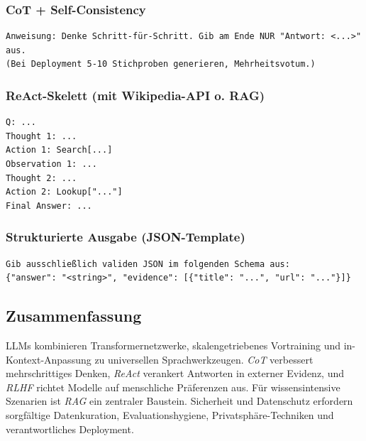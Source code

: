 \subsubsection*{CoT + Self-Consistency}
\begin{verbatim}
Anweisung: Denke Schritt-für-Schritt. Gib am Ende NUR "Antwort: <...>" aus.
(Bei Deployment 5-10 Stichproben generieren, Mehrheitsvotum.)
\end{verbatim}

\subsubsection*{ReAct-Skelett (mit Wikipedia-API o. RAG)}
\begin{verbatim}
Q: ...
Thought 1: ...
Action 1: Search[...]
Observation 1: ...
Thought 2: ...
Action 2: Lookup["..."]
Final Answer: ...
\end{verbatim}

\subsubsection*{Strukturierte Ausgabe (JSON-Template)}
\begin{verbatim}
Gib ausschließlich validen JSON im folgenden Schema aus:
{"answer": "<string>", "evidence": [{"title": "...", "url": "..."}]}
\end{verbatim}

\subsection{Zusammenfassung}
LLMs kombinieren Transformernetzwerke, skalengetriebenes Vortraining und in-Kontext-Anpassung zu universellen Sprachwerkzeugen. \emph{CoT} verbessert mehrschrittiges Denken, \emph{ReAct} verankert Antworten in externer Evidenz, und \emph{RLHF} richtet Modelle auf menschliche Präferenzen aus. Für wissensintensive Szenarien ist \emph{RAG} ein zentraler Baustein. Sicherheit und Datenschutz erfordern sorgfältige Datenkuration, Evaluationshygiene, Privatsphäre-Techniken und verantwortliches Deployment. 

